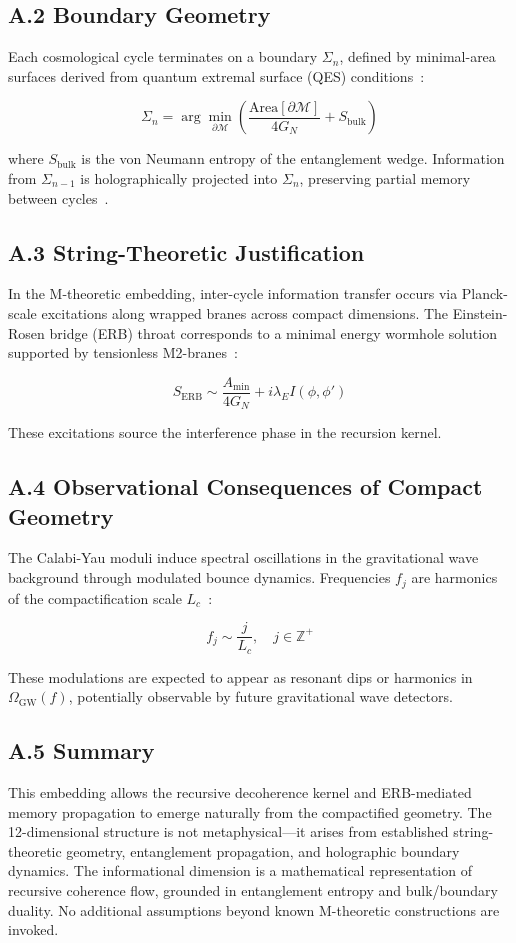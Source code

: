 \subsection*{A.2 Boundary Geometry}

Each cosmological cycle terminates on a boundary $\Sigma_n$, defined by minimal-area surfaces derived from quantum extremal surface (QES) conditions~\cite{engelhardt2015coarse}:

\[
\Sigma_n = \arg\min_{\partial \mathcal{M}} \left( \frac{\mathrm{Area}[\partial \mathcal{M}]}{4G_N} + S_{\text{bulk}} \right)
\]

where $S_{\text{bulk}}$ is the von Neumann entropy of the entanglement wedge. Information from $\Sigma_{n-1}$ is holographically projected into $\Sigma_n$, preserving partial memory between cycles~\cite{almheiri2019entropy}.

\subsection*{A.3 String-Theoretic Justification}

In the M-theoretic embedding, inter-cycle information transfer occurs via Planck-scale excitations along wrapped branes across compact dimensions. The Einstein-Rosen bridge (ERB) throat corresponds to a minimal energy wormhole solution supported by tensionless M2-branes~\cite{maldacena2013cool}:

\[
S_{\text{ERB}} \sim \frac{A_{\text{min}}}{4G_N} + i \lambda_E I(\phi, \phi')
\]

These excitations source the interference phase in the recursion kernel.

\subsection*{A.4 Observational Consequences of Compact Geometry}

The Calabi-Yau moduli induce spectral oscillations in the gravitational wave background through modulated bounce dynamics. Frequencies $f_j$ are harmonics of the compactification scale $L_c$~\cite{dienes1997string}:

\[
f_j \sim \frac{j}{L_c}, \quad j \in \mathbb{Z}^+
\]

These modulations are expected to appear as resonant dips or harmonics in $\Omega_{\text{GW}}(f)$, potentially observable by future gravitational wave detectors.

\subsection*{A.5 Summary}

This embedding allows the recursive decoherence kernel and ERB-mediated memory propagation to emerge naturally from the compactified geometry. The 12-dimensional structure is not metaphysical—it arises from established string-theoretic geometry, entanglement propagation, and holographic boundary dynamics. The informational dimension is a mathematical representation of recursive coherence flow, grounded in entanglement entropy and bulk/boundary duality. No additional assumptions beyond known M-theoretic constructions are invoked.
